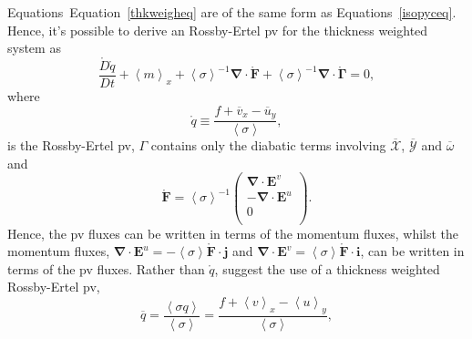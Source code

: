 \documentclass[12pt,a4paper]{report}
\newcommand*\thkmean[1]{\overline{#1}}
\newcommand*\nthkmean[1]{\left\langle{#1}\right\rangle}
\newcommand*\spec[1]{\mathring{#1}}
\newcommand*\equref[1]{Equation~\eqref{#1}}
\begin{document}
                      Equations~\equref{thkweigheq} are of the same form as Equations~\ref{isopyceq}.
                      Hence, it's possible to derive an
                      Rossby-Ertel \gls{pv} for the thickness weighted system
                      as
                      \begin{equation}
                      \frac{\spec{D} \spec{q}}{D t} + \nthkmean{m}_{x} 
                      +\nthkmean{\sigma}^{-1}\boldsymbol{\nabla}\cdot\spec{\boldsymbol{F}}
                      +\nthkmean{\sigma}^{-1}\boldsymbol{\nabla}\cdot\spec{\boldsymbol{\Gamma}}=0,
                      \end{equation} 
                      where
                      \begin{equation}
                      \spec{q}\equiv\frac{f+\thkmean{v}_{x}-\thkmean{u}_{y}}{\nthkmean{\sigma}},
                      \end{equation}
                      is the Rossby-Ertel \gls{pv}, $\Gamma$ contains only the diabatic terms involving $\thkmean{\mathcal{X}} $, $\thkmean{\mathcal{Y}} $ and $\thkmean{\omega} $ and 
                      \begin{equation}
                      \spec{\boldsymbol{F}}=\nthkmean{\sigma}^{-1}\left(
                      \begin{array}{c}
                      \boldsymbol{\nabla}\cdot\boldsymbol{E}^v \\
                      -\boldsymbol{\nabla}\cdot\boldsymbol{E}^u\\
                      0 \\
                      \end{array}\right).
                      \end{equation}
                      Hence, the \gls{pv} fluxes can be written in terms of
                      the momentum fluxes, whilst the momentum fluxes, ${\boldsymbol{\nabla}\cdot\boldsymbol{E}^u = -\nthkmean{\sigma} \spec{\boldsymbol{F}}\cdot\boldsymbol{j}}$ and                      ${\boldsymbol{\nabla}\cdot\boldsymbol{E}^v = \nthkmean{\sigma} \spec{\boldsymbol{F}}\cdot\boldsymbol{i}}$,
                      can be written in terms of the \gls{pv} fluxes.
                      Rather than $\spec{q}$, \cite{greatbatch1998exploring} suggest
                      the use of a thickness weighted Rossby-Ertel \gls{pv},
                      \begin{equation}
                      \thkmean{q}=\frac{\nthkmean{\sigma q}}{\nthkmean{\sigma}}=\frac{f+\nthkmean{v}_{x}-\nthkmean{u}_{y}}{\nthkmean{\sigma}},
                      \end{equation}
\end{document}
